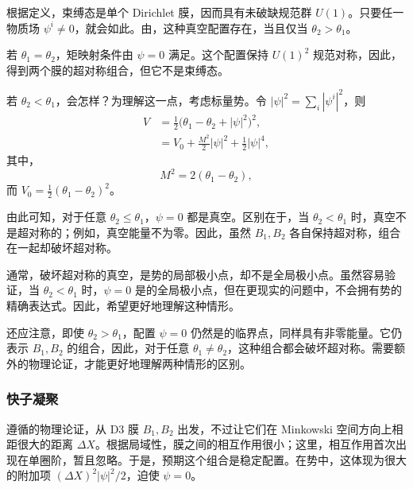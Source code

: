 根据定义，束缚态是单个 Dirichlet 膜，因而具有未破缺规范群 $U(1)$。只要任一物质场 $\psi^i\ne0$，就会如此。由，这种真空配置存在，当且仅当 $\theta_2>\theta_1$。

若 $\theta_1=\theta_2$，矩映射条件由 $\psi=0$ 满足。这个配置保持 $U(1)^2$ 规范对称，因此，得到两个膜的超对称组合，但它不是束缚态。

若 $\theta_2<\theta_1$，会怎样？为理解这一点，考虑标量势。令 $|\psi|^2=\sum_i|\psi^i|^2$，则
\begin{align}
V&=\frac12\bigl(\theta_1-\theta_2+|\psi|^2\bigr)^2,\label{eq:5.91}\\
&=V_0+\frac{M^2}{2}|\psi|^2+\frac12|\psi|^4,\label{eq:5.92}
\end{align}
其中，
\begin{equation}\label{eq:5.93}
M^2=2(\theta_1-\theta_2),
\end{equation}
而 $V_0=\tfrac12(\theta_1-\theta_2)^2$。

由此可知，对于任意 $\theta_2\le\theta_1$，$\psi=0$ 都是真空。区别在于，当 $\theta_2<\theta_1$ 时，真空不是超对称的；例如，真空能量不为零。因此，虽然 $B_1,B_2$ 各自保持超对称，组合在一起却破坏超对称。

通常，破坏超对称的真空，是势的局部极小点，却不是全局极小点。虽然容易验证，当 $\theta_2<\theta_1$ 时，$\psi=0$ 是的全局极小点，但在更现实的问题中，不会拥有势的精确表达式。因此，希望更好地理解这种情形。

还应注意，即使 $\theta_2>\theta_1$，配置 $\psi=0$ 仍然是的临界点，同样具有非零能量。它仍表示 $B_1,B_2$ 的组合，因此，对于任意 $\theta_1\ne\theta_2$，这种组合都会破坏超对称。需要额外的物理论证，才能更好地理解两种情形的区别。

\subsubsection{快子凝聚}\label{sec:5.4.4.2}

遵循的物理论证，从 D3 膜 $B_1,B_2$ 出发，不过让它们在 Minkowski 空间方向上相距很大的距离 $\Delta X$。根据局域性，膜之间的相互作用很小；这里，相互作用首次出现在单圈阶，暂且忽略。于是，预期这个组合是稳定配置。在势中，这体现为很大的附加项 $(\Delta X)^2|\psi|^2/2$，迫使 $\psi=0$。

